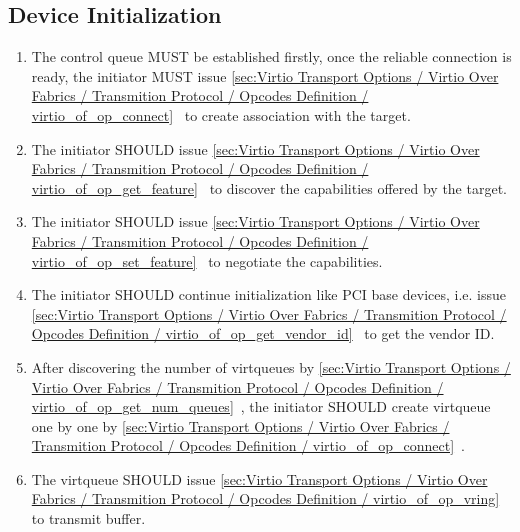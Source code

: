 \subsection{Device Initialization}\label{sec:Virtio Transport Options / Virtio Over Fabrics / Device Initialization}
\begin{enumerate}
\item The control queue MUST be established firstly, once the reliable connection is ready, the initiator MUST issue \ref{sec:Virtio Transport Options / Virtio Over Fabrics / Transmition Protocol / Opcodes Definition / virtio_of_op_connect}~ to create association with the target.
\item The initiator SHOULD issue \ref{sec:Virtio Transport Options / Virtio Over Fabrics / Transmition Protocol / Opcodes Definition / virtio_of_op_get_feature}~ to discover the capabilities offered by the target.
\item The initiator SHOULD issue \ref{sec:Virtio Transport Options / Virtio Over Fabrics / Transmition Protocol / Opcodes Definition / virtio_of_op_set_feature}~ to negotiate the capabilities.
\item The initiator SHOULD continue initialization like PCI base devices, i.e. issue \ref{sec:Virtio Transport Options / Virtio Over Fabrics / Transmition Protocol / Opcodes Definition / virtio_of_op_get_vendor_id}~ to get the vendor ID.
\item After discovering the number of virtqueues by \ref{sec:Virtio Transport Options / Virtio Over Fabrics / Transmition Protocol / Opcodes Definition / virtio_of_op_get_num_queues}~, the initiator SHOULD create virtqueue one by one by \ref{sec:Virtio Transport Options / Virtio Over Fabrics / Transmition Protocol / Opcodes Definition / virtio_of_op_connect}~.
\item The virtqueue SHOULD issue \ref{sec:Virtio Transport Options / Virtio Over Fabrics / Transmition Protocol / Opcodes Definition / virtio_of_op_vring}~ to transmit buffer.
\end{enumerate}
